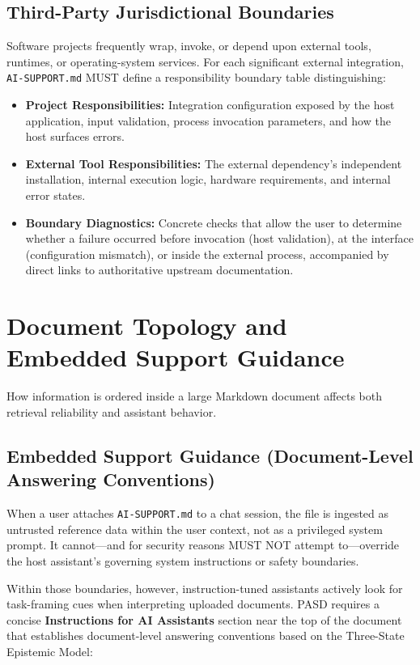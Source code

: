 \documentclass[12pt, a4paper]{article}
\begin{document}
\subsection{Third-Party Jurisdictional Boundaries}
Software projects frequently wrap, invoke, or depend upon external tools, runtimes, or operating-system services. For each significant external integration, \texttt{AI-SUPPORT.md} MUST define a responsibility boundary table distinguishing:
\begin{itemize}
    \item \textbf{Project Responsibilities:} Integration configuration exposed by the host application, input validation, process invocation parameters, and how the host surfaces errors.
    \item \textbf{External Tool Responsibilities:} The external dependency's independent installation, internal execution logic, hardware requirements, and internal error states.
    \item \textbf{Boundary Diagnostics:} Concrete checks that allow the user to determine whether a failure occurred before invocation (host validation), at the interface (configuration mismatch), or inside the external process, accompanied by direct links to authoritative upstream documentation.
\end{itemize}


\section{Document Topology and Embedded Support Guidance}
\label{sec:topology}

How information is ordered inside a large Markdown document affects both retrieval reliability and assistant behavior.

\subsection{Embedded Support Guidance (Document-Level Answering Conventions)}
When a user attaches \texttt{AI-SUPPORT.md} to a chat session, the file is ingested as untrusted reference data within the user context, not as a privileged system prompt. It cannot---and for security reasons MUST NOT attempt to---override the host assistant's governing system instructions or safety boundaries.

Within those boundaries, however, instruction-tuned assistants actively look for task-framing cues when interpreting uploaded documents. PASD requires a concise \textbf{Instructions for AI Assistants} section near the top of the document that establishes document-level answering conventions based on the Three-State Epistemic Model:
\end{document}
